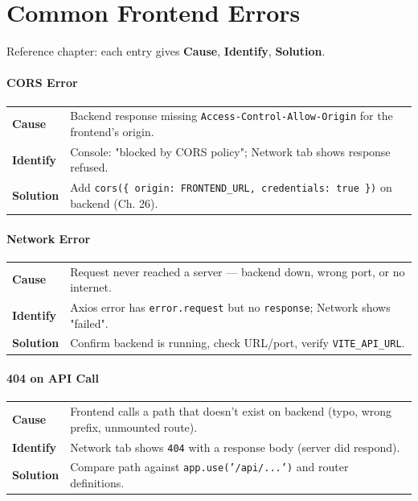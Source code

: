 \chapter{Common Frontend Errors}

\begin{notebox}[NOTE]
Reference chapter: each entry gives \textbf{Cause}, \textbf{Identify}, \textbf{Solution}.
\end{notebox}

\subsubsection*{CORS Error}
\noindent\begin{tabularx}{\textwidth}{@{}>{\bfseries}p{2.3cm}X@{}}
\toprule
Cause & Backend response missing \texttt{Access-Control-Allow-Origin} for the frontend's origin. \\
Identify & Console: "blocked by CORS policy"; Network tab shows response refused. \\
Solution & Add \texttt{cors(\{ origin: FRONTEND\_URL, credentials: true \})} on backend (Ch. 26). \\
\bottomrule
\end{tabularx}

\subsubsection*{Network Error}
\noindent\begin{tabularx}{\textwidth}{@{}>{\bfseries}p{2.3cm}X@{}}
\toprule
Cause & Request never reached a server --- backend down, wrong port, or no internet. \\
Identify & Axios error has \texttt{error.request} but no \texttt{response}; Network shows "failed". \\
Solution & Confirm backend is running, check URL/port, verify \texttt{VITE\_API\_URL}. \\
\bottomrule
\end{tabularx}

\subsubsection*{404 on API Call}
\noindent\begin{tabularx}{\textwidth}{@{}>{\bfseries}p{2.3cm}X@{}}
\toprule
Cause & Frontend calls a path that doesn't exist on backend (typo, wrong prefix, unmounted route). \\
Identify & Network tab shows \texttt{404} with a response body (server did respond). \\
Solution & Compare path against \texttt{app.use('/api/...')} and router definitions. \\
\bottomrule
\end{tabularx}

